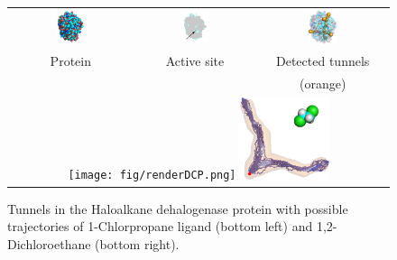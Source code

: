 \documentclass{bmcart}
\begin{document}
\begin{figure}[t]
\centering
{\footnotesize
\renewcommand{\arraystretch}{-0.5}
\renewcommand{\tabcolsep}{-1pt}
\begin{tabular}{ccc}
\includegraphics[width=0.24\textwidth]
{fig/motiv1} &
\includegraphics[width=0.25\textwidth]
{fig/motiv2lab} &
\includegraphics[width=0.24\textwidth]
{fig/motiv3}  \\
Protein  & Active site & Detected tunnels \\ %
             &            & (orange)         \\  %
\multicolumn{3}{c}{%
\texttt{[image: fig/renderDCP.png]}  \hskip 15pt
\includegraphics[width=0.24\textwidth]
{fig/render37t.png}} \\ 
\end{tabular}
}
\caption{\label{fig::motiv}
    \small
    Tunnels in the Haloalkane dehalogenase protein with possible trajectories of 1-Chlorpropane ligand (bottom left) and 1,2-Dichloroethane (bottom right).
}
\end{figure}
\end{document}
